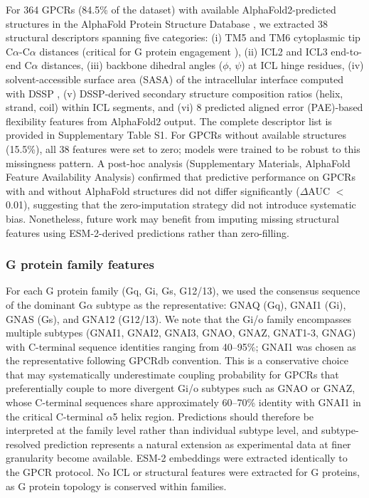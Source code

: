 \documentclass[11pt,a4paper]{article}
\begin{document}
For 364 GPCRs (84.5\% of the dataset) with available AlphaFold2-predicted structures in the AlphaFold Protein Structure Database \cite{jumper2021highly, varadi2024alphafold}, we extracted 38 structural descriptors spanning five categories: (i) TM5 and TM6 cytoplasmic tip C$\alpha$-C$\alpha$ distances (critical for G protein engagement \cite{flock2023selectivity}), (ii) ICL2 and ICL3 end-to-end C$\alpha$ distances, (iii) backbone dihedral angles ($\phi$, $\psi$) at ICL hinge residues, (iv) solvent-accessible surface area (SASA) of the intracellular interface computed with DSSP \cite{kabsch1983dictionary}, (v) DSSP-derived secondary structure composition ratios (helix, strand, coil) within ICL segments, and (vi) 8 predicted aligned error (PAE)-based flexibility features from AlphaFold2 output. The complete descriptor list is provided in Supplementary Table S1. For GPCRs without available structures (15.5\%), all 38 features were set to zero; models were trained to be robust to this missingness pattern. A post-hoc analysis (Supplementary Materials, AlphaFold Feature Availability Analysis) confirmed that predictive performance on GPCRs with and without AlphaFold structures did not differ significantly ($\Delta$AUC $<$ 0.01), suggesting that the zero-imputation strategy did not introduce systematic bias. Nonetheless, future work may benefit from imputing missing structural features using ESM-2-derived predictions rather than zero-filling.

\subsubsection{G protein family features}

For each G protein family (Gq, Gi, Gs, G12/13), we used the consensus sequence of the dominant G$\alpha$ subtype as the representative: GNAQ (Gq), GNAI1 (Gi), GNAS (Gs), and GNA12 (G12/13). We note that the Gi/o family encompasses multiple subtypes (GNAI1, GNAI2, GNAI3, GNAO, GNAZ, GNAT1-3, GNAG) with C-terminal sequence identities ranging from 40--95\%; GNAI1 was chosen as the representative following GPCRdb convention. This is a conservative choice that may systematically underestimate coupling probability for GPCRs that preferentially couple to more divergent Gi/o subtypes such as GNAO or GNAZ, whose C-terminal sequences share approximately 60--70\% identity with GNAI1 in the critical C-terminal $\alpha$5 helix region. Predictions should therefore be interpreted at the family level rather than individual subtype level, and subtype-resolved prediction represents a natural extension as experimental data at finer granularity become available. ESM-2 embeddings were extracted identically to the GPCR protocol. No ICL or structural features were extracted for G proteins, as G protein topology is conserved within families.
\end{document}
